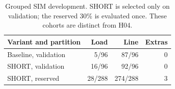 \begin{table}[t]\centering
\caption{Grouped SIM development. SHORT is selected only on validation; the reserved 30\% is evaluated once. These cohorts are distinct from H04.}
\label{tab:grouped-learning}
\small\setlength{\tabcolsep}{4pt}
\begin{tabular}{lrrr}\hline
Variant and partition & Load & Line & Extras\\\hline
Baseline, validation & 5/96 & 87/96 & 0 \\
SHORT, validation & 16/96 & 92/96 & 0 \\
SHORT, reserved & 28/288 & 274/288 & 3 \\
\hline\end{tabular}
\end{table}
